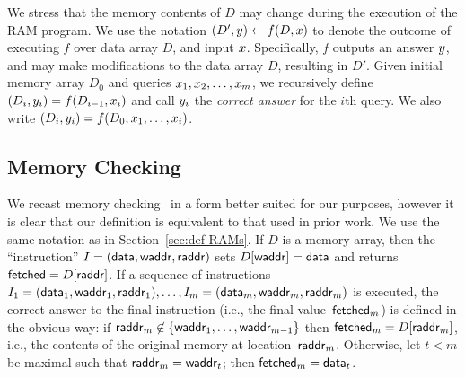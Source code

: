 {We stress that the memory contents of $D$ may change during the execution of the RAM program.
We use the notation $(D', y) \leftarrow f(D, x)$
to denote the outcome of executing $f$ over data array $D$, and input $x$. Specifically,
$f$ outputs an answer $y$, and may make modifications to the data array $D$, resulting
in $D'$.
Given initial memory array $D_0$ and queries $x_1, x_2, \ldots,
x_m$, we recursively define $(D_i, y_i) = f(D_{i-1}, x_i)$ and call $y_i$ the
\textit{correct answer}
for the $i$th query. We also write $(D_i, y_i) = f(D_0, x_1, \ldots, x_i)$. 
}




\subsection{Memory Checking}
\label{app:MC}
We recast memory checking~\cite{blum-memories-94} in a form better suited for our purposes,
however it is clear that our definition is equivalent to that used in prior work.
We use the same notation as in Section~\ref{sec:def-RAMs}. If $D$ is a memory array,
then the ``instruction'' $I=(\mathsf{data}, \mathsf{waddr}, \mathsf{raddr})$
sets $D[\mathsf{waddr}] = \mathsf{data}$ and
returns
${\sf fetched} = D[\mathsf{raddr}]$.
If a sequence of instructions $I_1=(\mathsf{data}_1, \mathsf{waddr}_1, \mathsf{raddr}_1), \ldots,
I_m = (\mathsf{data}_m, \mathsf{waddr}_m, \mathsf{raddr}_m)$ is executed, the correct answer to the final
instruction (i.e., the final value~${\sf fetched}_m$) is defined in the obvious way:
if $\mathsf{raddr}_m \not \in \{\mathsf{waddr}_1, \ldots, \mathsf{waddr}_{m-1}\}$ then ${\sf fetched}_m = D[\mathsf{raddr}_m]$,
i.e., the contents of the original memory at location~$\mathsf{raddr}_m$. Otherwise, let
$t<m$ be maximal such that $\mathsf{raddr}_m = \mathsf{waddr}_t$; then ${\sf fetched}_m = \mathsf{data}_t$.

